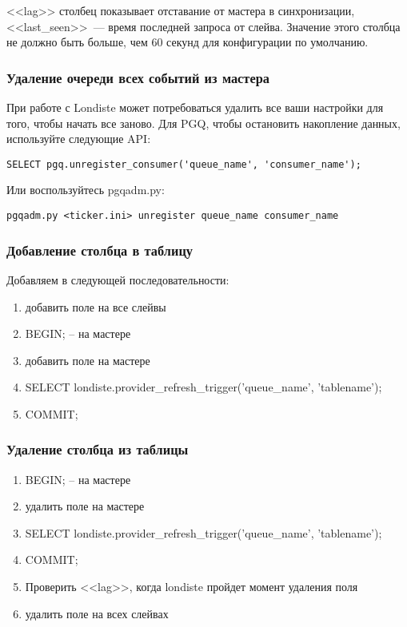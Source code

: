 <<lag>> столбец показывает отставание от мастера в синхронизации,
<<last\_seen>>~--- время последней запроса от слейва. Значение этого столбца не должно быть больше,
чем 60 секунд для конфигурации по умолчанию.

\subsubsection{Удаление очереди всех событий из мастера}
При работе с Londiste может потребоваться удалить все ваши настройки для того, чтобы начать все заново.
Для PGQ, чтобы остановить накопление данных, используйте следующие API:
\begin{lstlisting}[label=lst:londiste22,caption=Удаление очереди всех событий из мастера]
SELECT pgq.unregister_consumer('queue_name', 'consumer_name');
\end{lstlisting}

Или воспользуйтесь pgqadm.py:
\begin{lstlisting}[label=lst:londiste23,caption=Удаление очереди всех событий из мастера]
pgqadm.py <ticker.ini> unregister queue_name consumer_name
\end{lstlisting}

\subsubsection{Добавление столбца в таблицу}
Добавляем в следующей последовательности:
\begin{enumerate}
 \item добавить поле на все слейвы
 \item BEGIN; -- на мастере
 \item добавить поле на мастере
 \item SELECT londiste.provider\_refresh\_trigger('queue\_name', 'tablename');
 \item COMMIT;
\end{enumerate}

\subsubsection{Удаление столбца из таблицы}
\begin{enumerate}
 \item BEGIN; -- на мастере
 \item удалить поле на мастере
 \item SELECT londiste.provider\_refresh\_trigger('queue\_name', 'tablename');
 \item COMMIT;
 \item Проверить <<lag>>, когда londiste пройдет момент удаления поля
 \item удалить поле на всех слейвах
\end{enumerate}


